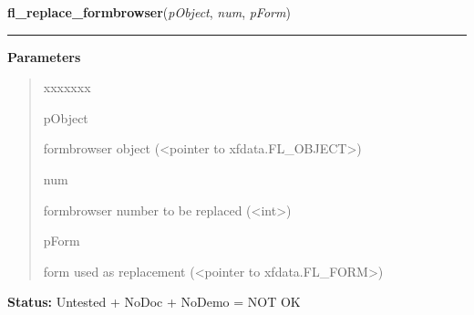 \hspace{.8\funcindent}\begin{boxedminipage}{\funcwidth}

    \raggedright \textbf{fl\_replace\_formbrowser}(\textit{pObject}, \textit{num}, \textit{pForm})

    \vspace{-1.5ex}

    \rule{\textwidth}{0.5\fboxrule}
\setlength{\parskip}{2ex}
\setlength{\parskip}{1ex}
      \textbf{Parameters}
      \vspace{-1ex}

      \begin{quote}
        \begin{Ventry}{xxxxxxx}

          \item[pObject]

          formbrowser object ({\textless}pointer to 
          xfdata.FL\_OBJECT{\textgreater})

          \item[num]

          formbrowser number to be replaced ({\textless}int{\textgreater})

          \item[pForm]

          form used as replacement ({\textless}pointer to 
          xfdata.FL\_FORM{\textgreater})

        \end{Ventry}

      \end{quote}

\textbf{Status:} Untested + NoDoc + NoDemo = NOT OK



    \end{boxedminipage}

    \label{xformslib:library:fl_insert_formbrowser}

    \vspace{0.5ex}

